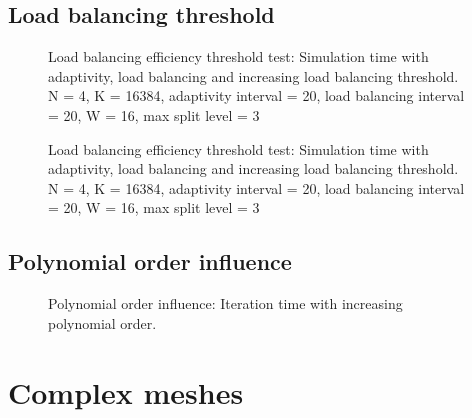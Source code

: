 \subsection{Load balancing threshold} \label{section:results:load_balancing_performance:threshold}

\begin{figure}[H]
	\centering
	
	\caption{Load balancing efficiency threshold test: Simulation time with adaptivity, load balancing and increasing load balancing threshold. N = 4, K = 16384, adaptivity interval = 20, load balancing interval = 20, W = 16, max split level = 3}
	\label{fig:load_balancing_efficiency_threshold_s3}
\end{figure}

\begin{figure}[H]
	\centering
	
	\caption{Load balancing efficiency threshold test: Simulation time with adaptivity, load balancing and increasing load balancing threshold. N = 4, K = 16384, adaptivity interval = 20, load balancing interval = 20, W = 16, max split level = 3}
	\label{fig:load_balancing_efficiency_threshold_s5}
\end{figure}

\subsection{Polynomial order influence}
\label{section:results:load_balancing_performance:polynomial_order}

\begin{figure}[H]
	\centering
	
	\caption{Polynomial order influence: Iteration time with increasing polynomial order.}
	\label{fig:N_influence}
\end{figure}

\section{Complex meshes} \label{section:results:complex_meshes}


